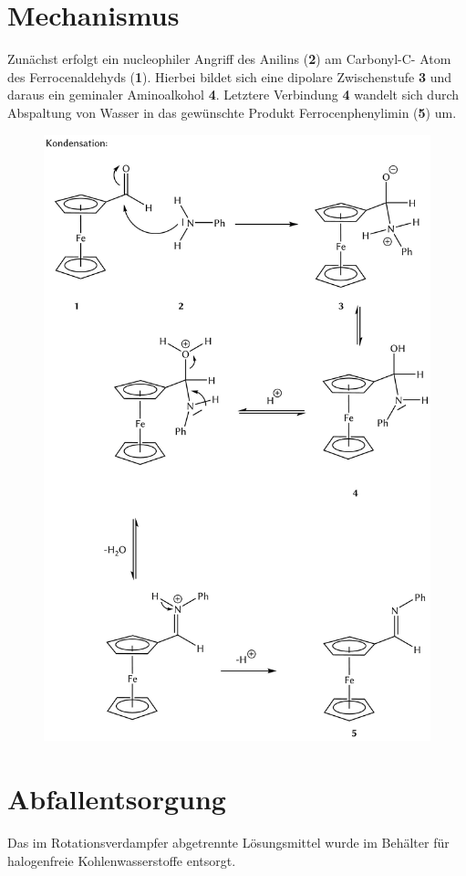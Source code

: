 \documentclass[12pt]{article}
\begin{document}
\begin{onehalfspace}
\section{Mechanismus\cite{bio}}
Zunächst erfolgt ein nucleophiler Angriff des Anilins (\textbf{2}) am Carbonyl-C-
Atom des Ferrocenaldehyds (\textbf{1}). Hierbei bildet sich eine dipolare Zwischenstufe \textbf{3} 
und daraus ein geminaler Aminoalkohol \textbf{4}. Letztere Verbindung \textbf{4} wandelt sich durch Abspaltung
von Wasser in das gewünschte Produkt Ferrocenphenylimin (\textbf{5}) um.
\begin{figure}[!ht]
   \centering
\includegraphics[width=\textwidth]{mechan.png}
\end{figure}
\section{Abfallentsorgung}
Das im Rotationsverdampfer abgetrennte Lösungsmittel wurde im Behälter für halogenfreie Kohlenwasserstoffe entsorgt.

\end{onehalfspace}
\end{document}
